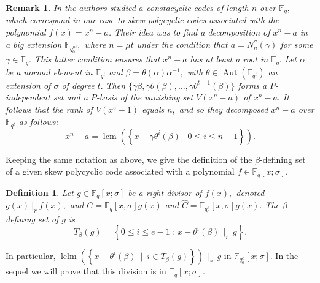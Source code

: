 \documentclass[12pt,paper]{article}
\theoremstyle{plain}
\newtheorem{definition}[theorem]{Definition}
\newtheorem{remark}[theorem]{Remark}
\newcommand{\Fq}{\mathbb{F}_{q}}
\DeclareMathOperator{\aut}{Aut}
\DeclareMathOperator{\lcm}{lcm}
\DeclareMathOperator{\lclm}{lclm}
\begin{document}
\begin{remark} \label{RmqConsta}
In \cite{Cathryn2024, Lobillo2025} the authors studied 
$a$-constacyclic codes of length $n$ over $\Fq,$ which correspond in our case to skew polycyclic codes associated 
    with the polynomial $f(x)=x^n-a$. 
    Their  idea was to find a decomposition of $x^n-a$ in a big extension  $ \mathbb{F}_{q_0^{\mu t}},$ where $ n=\mu t$ under the  condition that $ a=N_n^{\sigma}(\gamma)$ for some $\gamma\in \Fq.$ This latter condition ensures that $x^n-a$ has at least a root in $\Fq. $ Let $\alpha$ be a normal element in $\mathbb{F}_{q^t}$ and  $ \beta=\theta(\alpha) \alpha^{-1},$ with $\theta \in \aut(\mathbb{F}_{q^t})$ an extension of $\sigma$ of degree $t.$ Then  $\{ \gamma \beta, \gamma \theta(\beta),\ldots,  \gamma \theta^{t-1}(\beta )  \}$ forms a $P$-independent set and  a $P$-basis  of  the vanishing set  $V(x^n-a) $  of $x^n-a.$ It follows that the rank of $V(x^e-1) $ equals $n,$ and so they  decomposed $x^n-a$ over $ \mathbb{F}_{q^{t}} $ as follows:     
      $$
x^n-a=\lcm(\left\{x- \gamma \theta^i(\beta) \mid 0 \leq i \leq n-1\right\}).
$$
\end{remark}

Keeping the same notation as above,  we give the definition of the $\beta$-defining set of a given skew polycyclic code associated with a polynomial  $f\in \Fq[x;\sigma].$
\begin{definition} 
Let $g \in \Fq[x;\sigma]$ be  a right divisor of $f(x),$ denoted $ g(x) ~|_r~ f(x),$ and $ C= \Fq[x,\sigma] g(x)$ and $\widehat{C}= \mathbb{F}_{q_0^e}[x,\sigma] g(x) .$
The \emph{$\beta$-defining set} of $g$ is
$$
T_\beta(g)=\left\{ 0 \leq i \leq e-1  ~:~ x-\theta^i(\beta) ~~|_r~~ g \right\}.
$$
\end{definition}
In particular, $\lclm(\left\{x-\theta^i(\beta) ~ \mid~ i \in T_\beta(g) \right\}) ~ ~|_r~~ g$ in $ \mathbb{F}_{q_0^e}[x;\sigma].$ In the sequel we will prove that this division is in  $ \mathbb{F}_{q}[x;\sigma].$
\end{document}
